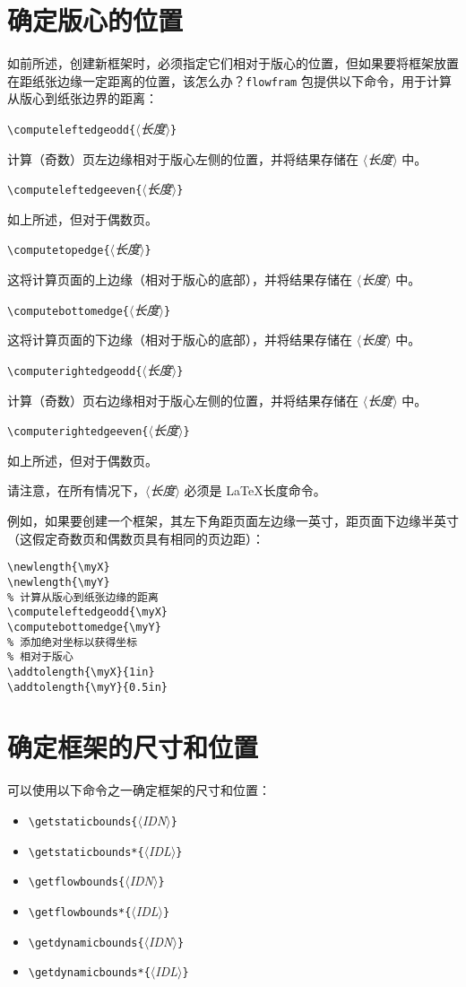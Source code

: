 \documentclass[a4paper]{book}%
\newcommand{\sty}[1]{\texttt{#1}}
\newcommand{\meta}[1]{\textnormal{\ensuremath{\langle}\makebox[0pt][l]{}\emph{#1}\makebox[0pt][l]{}\ensuremath{\rangle}}}
\begin{document}
\section{确定版心的位置}\label{sec-4-1}%
如前所述，创建新框架时，必须指定它们相对于版心的位置，但如果要将框架放置在距纸张边缘一定距离的位置，该怎么办？\sty{flowfram} 包提供以下命令，用于计算从版心到纸张边界的距离：
\begin{mdframed}
    \verb|\computeleftedgeodd{|\meta{长度}\verb|}|
\end{mdframed}
计算（奇数）页左边缘相对于版心左侧的位置，并将结果存储在 \meta{长度} 中。
\begin{mdframed}
    \verb|\computeleftedgeeven{|\meta{长度}\verb|}|
\end{mdframed}
如上所述，但对于偶数页。
\begin{mdframed}
    \verb|\computetopedge{|\meta{长度}\verb|}|
\end{mdframed}
这将计算页面的上边缘（相对于版心的底部），并将结果存储在 \meta{长度} 中。
\begin{mdframed}
    \verb|\computebottomedge{|\meta{长度}\verb|}|
\end{mdframed}
这将计算页面的下边缘（相对于版心的底部），并将结果存储在 \meta{长度} 中。
\begin{mdframed}
    \verb|\computerightedgeodd{|\meta{长度}\verb|}|
\end{mdframed}
计算（奇数）页右边缘相对于版心左侧的位置，并将结果存储在 \meta{长度} 中。
\begin{mdframed}
    \verb|\computerightedgeeven{|\meta{长度}\verb|}|
\end{mdframed}
如上所述，但对于偶数页。

请注意，在所有情况下，\meta{长度} 必须是 \LaTeX 长度命令。

例如，如果要创建一个框架，其左下角距页面左边缘一英寸，距页面下边缘半英寸（这假定奇数页和偶数页具有相同的页边距）：
\begin{lstlisting}[backgroundcolor=\color{white}]
% 定义两个新的长度来表示 x 和 y 坐标
\newlength{\myX}
\newlength{\myY}
% 计算从版心到纸张边缘的距离
\computeleftedgeodd{\myX}
\computebottomedge{\myY}
% 添加绝对坐标以获得坐标
% 相对于版心
\addtolength{\myX}{1in}
\addtolength{\myY}{0.5in}
\end{lstlisting}
\section{确定框架的尺寸和位置}%
可以使用以下命令之一确定框架的尺寸和位置：
\begin{itemize}
    \item \verb|\getstaticbounds{|\meta{IDN}\verb|}|
    \item \verb|\getstaticbounds*{|\meta{IDL}\verb|}|
    \item \verb|\getflowbounds{|\meta{IDN}\verb|}|
    \item \verb|\getflowbounds*{|\meta{IDL}\verb|}|
    \item \verb|\getdynamicbounds{|\meta{IDN}\verb|}|
    \item \verb|\getdynamicbounds*{|\meta{IDL}\verb|}|
\end{itemize}
\end{document}
